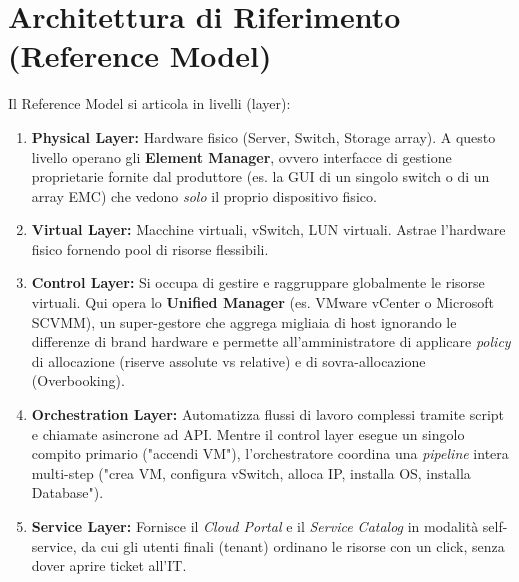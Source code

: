 \section{Architettura di Riferimento (Reference Model)}
Il Reference Model si articola in livelli (layer):
\begin{enumerate}
    \item \textbf{Physical Layer:} Hardware fisico (Server, Switch, Storage array). A questo livello operano gli \textbf{Element Manager}, ovvero interfacce di gestione proprietarie fornite dal produttore (es. la GUI di un singolo switch o di un array EMC) che vedono \textit{solo} il proprio dispositivo fisico.
    \item \textbf{Virtual Layer:} Macchine virtuali, vSwitch, LUN virtuali. Astrae l'hardware fisico fornendo pool di risorse flessibili.
    \item \textbf{Control Layer:} Si occupa di gestire e raggruppare globalmente le risorse virtuali. Qui opera lo \textbf{Unified Manager} (es. VMware vCenter o Microsoft SCVMM), un super-gestore che aggrega migliaia di host ignorando le differenze di brand hardware e permette all'amministratore di applicare \textit{policy} di allocazione (riserve assolute vs relative) e di sovra-allocazione (Overbooking).
    \item \textbf{Orchestration Layer:} Automatizza flussi di lavoro complessi tramite script e chiamate asincrone ad API. Mentre il control layer esegue un singolo compito primario ("accendi VM"), l'orchestratore coordina una \textit{pipeline} intera multi-step ("crea VM, configura vSwitch, alloca IP, installa OS, installa Database").
    \item \textbf{Service Layer:} Fornisce il \textit{Cloud Portal} e il \textit{Service Catalog} in modalità self-service, da cui gli utenti finali (tenant) ordinano le risorse con un click, senza dover aprire ticket all'IT.
\end{enumerate}


